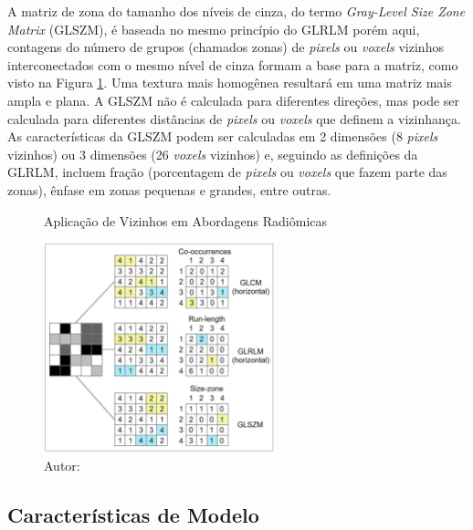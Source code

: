 A matriz de zona do tamanho dos níveis de cinza, do termo \textit{Gray-Level Size Zone Matrix} (GLSZM), é baseada no mesmo princípio do GLRLM porém aqui, contagens do número de grupos (chamados zonas) de \textit{pixels} ou \textit{voxels} vizinhos interconectados com o mesmo nível de cinza formam a base para a matriz, como visto na Figura \ref{fig:fig002}. Uma textura mais homogênea resultará em uma matriz mais ampla e plana. A GLSZM não é calculada para diferentes direções, mas pode ser calculada para diferentes distâncias de \textit{pixels} ou \textit{voxels} que definem a vizinhança. As características da GLSZM podem ser calculadas em 2 dimensões (8 \textit{pixels} vizinhos) ou 3 dimensões (26 \textit{voxels} vizinhos) e, seguindo as definições da GLRLM, incluem fração (porcentagem de \textit{pixels} ou \textit{voxels} que fazem parte das zonas), ênfase em zonas pequenas e grandes, entre outras.

\begin{figure}[htbp]
    \centering
    \captionsetup{width=0.98\textwidth, justification=justified}
    \caption{Aplicação de Vizinhos em Abordagens Radiômicas}
    \includegraphics[width=0.6\textwidth]{figures/fig002.png}
    \caption*{Autor: \cite{mayerhoeferIntroductionRadiomics2020}}
    \label{fig:fig002}
\end{figure}

\subsection{Características de Modelo}

